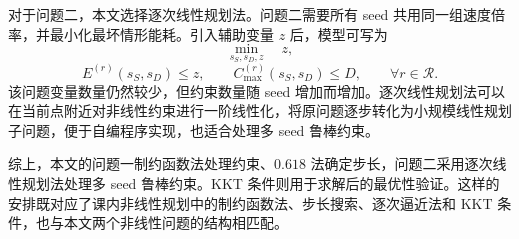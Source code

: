 对于问题二，本文选择逐次线性规划法。问题二需要所有 seed 共用同一组速度倍率，并最小化最坏情形能耗。引入辅助变量 $z$ 后，模型可写为
\[
\min_{s_S,s_D,z}\quad z,
\]
\[
E^{(r)}(s_S,s_D)\leq z,\qquad
C_{\max}^{(r)}(s_S,s_D)\leq D,\qquad \forall r\in\mathcal{R}.
\]
该问题变量数量仍然较少，但约束数量随 seed 增加而增加。逐次线性规划法可以在当前点附近对非线性约束进行一阶线性化，将原问题逐步转化为小规模线性规划子问题，便于自编程序实现，也适合处理多 seed 鲁棒约束。

综上，本文的问题一制约函数法处理约束、$0.618$ 法确定步长，问题二采用逐次线性规划法处理多 seed 鲁棒约束。KKT 条件则用于求解后的最优性验证。这样的安排既对应了课内非线性规划中的制约函数法、步长搜索、逐次逼近法和 KKT 条件，也与本文两个非线性问题的结构相匹配。

